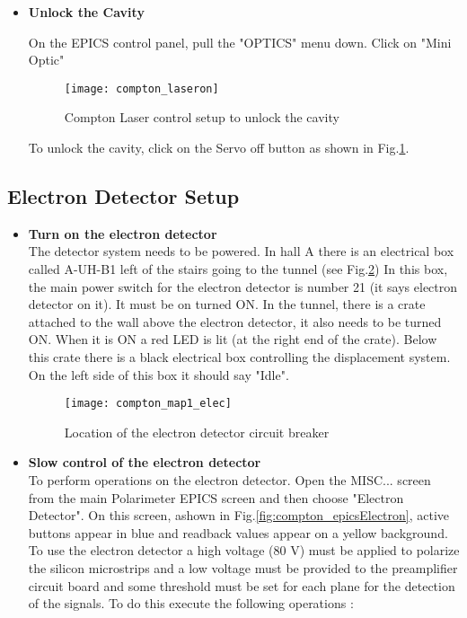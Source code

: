 {{\begin{itemize}
\item {\bf Unlock the Cavity}

On the EPICS control panel, pull the "OPTICS" menu down. Click on "Mini Optic" 
\begin{figure}[htp]
    \begin{center}    
        \texttt{[image: compton\_laseron]}
    \end{center}
    \caption[compton:laser control ]{Compton Laser control setup to unlock the cavity}
    \label{fig:compton_laseron}
\end{figure}


To unlock the cavity, click on the Servo off button as shown in Fig.\ref{fig:compton_laseron}.
\end{itemize}
    
\newpage
\subsection{Electron Detector Setup}
\begin{itemize}
\item {\bf Turn on the electron detector}\\
        The detector system needs to be powered. In hall A there is an
        electrical box called A-UH-B1 left of the stairs going to the tunnel 
	(see Fig.\ref{fig:compton_map1_elec})
        In this box, the main power switch for the electron detector is number 21 (it says electron
        detector on it). It must be on turned ON. In the tunnel,
        there is a crate attached to the wall above the electron detector, it also needs to be turned ON.
        When it is ON a red LED is lit (at the right end of the crate). Below this crate there is a black electrical
        box controlling the displacement system. On the left side of this box it should say "Idle".
\begin{figure}[htp]
    \begin{center}
        \texttt{[image: compton\_map1\_elec]}
    \end{center}
    \caption[compton:electron detector circuit breaker]{Location of the electron detector circuit breaker}
    \label{fig:compton_map1_elec}
\end{figure}

\item {\bf Slow control of the electron detector }\\
To perform operations on the electron detector. Open the MISC... screen from the main Polarimeter EPICS screen
and then choose "Electron Detector". On this screen, ashown in Fig.\ref{fig:compton_epicsElectron},
 active buttons appear in blue
and readback values appear on a yellow background. 
To use the electron detector a high voltage
(80 V) must be applied to polarize the silicon
microstrips and a low voltage must be provided to the preamplifier
circuit board and some threshold must be set for each plane for
the detection of the signals. To do this execute the following operations :


\end{itemize}}}
